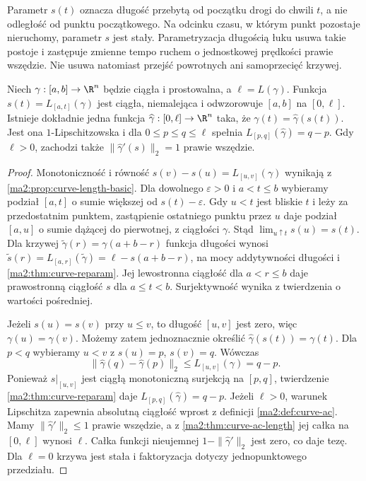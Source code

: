 Parametr $s(t)$ oznacza długość przebytą
od początku drogi do chwili $t$, a nie
odległość od punktu początkowego.
Na odcinku czasu, w którym punkt
pozostaje nieruchomy, parametr $s$
jest stały. Parametryzacja długością
łuku usuwa takie postoje i zastępuje
zmienne tempo ruchem o jednostkowej
prędkości prawie wszędzie. Nie usuwa
natomiast przejść powrotnych ani
samoprzecięć krzywej.

\begin{twierdzenie}
\label{ma2:thm:curve-arclength}
Niech $\gamma:[a,b]\to\R^n$ będzie ciągła
i prostowalna, a $\ell=L(\gamma)$.
Funkcja $s(t)=L_{[a,t]}(\gamma)$ jest ciągła,
niemalejąca i odwzorowuje $[a,b]$ na $[0,\ell]$.
Istnieje dokładnie jedna funkcja
$\widehat\gamma:[0,\ell]\to\R^n$ taka, że
$\gamma(t)=\widehat\gamma(s(t))$.
Jest ona $1$-Lipschitzowska i dla
$0\le p\le q\le\ell$ spełnia
$L_{[p,q]}(\widehat\gamma)=q-p$.
Gdy $\ell>0$, zachodzi także
$\|\widehat\gamma'(s)\|_2=1$ prawie wszędzie.
\end{twierdzenie}
\begin{proof}
Monotoniczność i równość
$s(v)-s(u)=L_{[u,v]}(\gamma)$ wynikają z
\ref{ma2:prop:curve-length-basic}.
Dla dowolnego $\varepsilon>0$ i $a<t\le b$
wybieramy podział $[a,t]$ o sumie
większej od $s(t)-\varepsilon$. Gdy $u<t$ jest
bliskie $t$ i leży za przedostatnim punktem,
zastąpienie ostatniego punktu przez $u$ daje
podział $[a,u]$ o sumie dążącej do pierwotnej,
z ciągłości $\gamma$. Stąd
$\lim_{u\uparrow t}s(u)=s(t)$.
Dla krzywej $\widetilde\gamma(r)=\gamma(a+b-r)$
funkcja długości wynosi
$\widetilde s(r)=L_{[a,r]}(\widetilde\gamma)
=\ell-s(a+b-r)$, na mocy addytywności długości
i \ref{ma2:thm:curve-reparam}. Jej lewostronna
ciągłość dla $a<r\le b$ daje prawostronną
ciągłość $s$ dla $a\le t<b$.
Surjektywność wynika z twierdzenia o wartości pośredniej.

Jeżeli $s(u)=s(v)$ przy $u\le v$, to długość
$[u,v]$ jest zero, więc $\gamma(u)=\gamma(v)$.
Możemy zatem jednoznacznie określić
$\widehat\gamma(s(t))=\gamma(t)$.
Dla $p<q$ wybieramy $u<v$ z $s(u)=p$, $s(v)=q$.
Wówczas
\[
 \|\widehat\gamma(q)-\widehat\gamma(p)\|_2
 \le L_{[u,v]}(\gamma)=q-p.
\]
Ponieważ $s|_{[u,v]}$ jest ciągłą monotoniczną
surjekcją na $[p,q]$, twierdzenie
\ref{ma2:thm:curve-reparam} daje
$L_{[p,q]}(\widehat\gamma)=q-p$.
Jeżeli $\ell>0$, warunek Lipschitza zapewnia
absolutną ciągłość wprost z definicji
\ref{ma2:def:curve-ac}. Mamy
$\|\widehat\gamma'\|_2\le1$ prawie wszędzie,
a z \ref{ma2:thm:curve-ac-length} jej całka
na $[0,\ell]$ wynosi $\ell$.
Całka funkcji nieujemnej $1-\|\widehat\gamma'\|_2$
jest zero, co daje tezę.
Dla $\ell=0$ krzywa jest stała i faktoryzacja
dotyczy jednopunktowego przedziału.
\end{proof}

